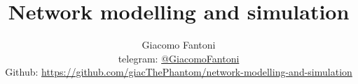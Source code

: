 

\title{\Huge\textbf{{Network modelling and simulation}}}

\author{
  Giacomo Fantoni \\
  \small telegram: \href{https://t.me/GiacomoFantoni}{@GiacomoFantoni} \\[3pt]
  \small Github: \href{https://github.com/giacThePhantom/network-modelling-and-simulation}{https://github.com/giacThePhantom/network-modelling-and-simulation}\\
}




  \maketitle
  \tableofcontents


